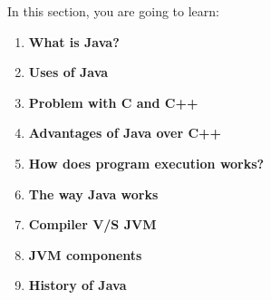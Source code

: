 
\setlength{\columnsep}{3pt}
\begin{flushleft}
	\bigskip
	\bigskip
	\begin{tcolorbox}[breakable,notitle,boxrule=1pt,colback=black,colframe=black]
	\color{white}
	\bigskip
	In this section, you are going to learn:
	\begin{enumerate}
		\item \textbf{What is Java?}
		\item \textbf{Uses of Java}
		\item \textbf{Problem with C and C++}
		\item \textbf{Advantages of Java over C++}
		\item \textbf{How does program execution works?}
		\item \textbf{The way Java works}
		\item \textbf{Compiler V/S JVM}
		\item \textbf{JVM components}
		\item \textbf{History of Java}
	\end{enumerate}	
	\end{tcolorbox}

	
	\bigskip
	\bigskip
	
	\begin{multicols}{2}
		\vspace*{\fill}
		\vspace*{\fill}
		\vspace*{\fill}
		\vspace*{\fill}
		\vspace*{\fill}
		\vspace*{\fill}
		\vspace*{\fill}
		\vspace*{\fill}
		\vspace*{\fill}
		
	\end{multicols}	
	
\end{flushleft}

\newpage





